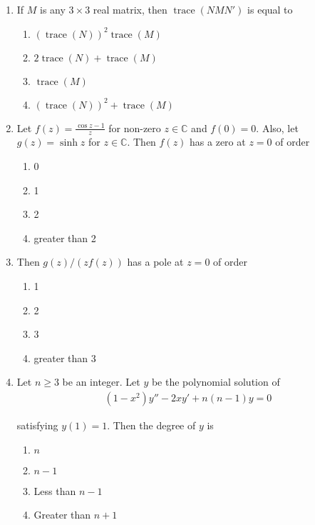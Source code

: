 \documentclass[journal]{IEEEtran}
\numberwithin{equation}{enumi}
\numberwithin{figure}{enumi}
\begin{document}
\begin{enumerate}
\item
If $M$ is any $3 \times 3$ real matrix, then $\operatorname{trace}(N M N')$ is equal to
\hfill{}
\begin{multicols}{2}
\begin{enumerate}
    \item $(\operatorname{trace}(N))^2 \operatorname{trace}(M)$
    \item $2 \operatorname{trace}(N) + \operatorname{trace}(M)$
    \item $\operatorname{trace}(M)$
    \item $(\operatorname{trace}(N))^2 + \operatorname{trace}(M)$
\end{enumerate}
\end{multicols}

\item
Let $f(z) = \frac{\cos z - 1}{z}$ for non-zero $z \in \mathbb{C}$ and $f(0) = 0$. Also, let $g(z) = \sinh z$ for $z \in \mathbb{C}$. Then $f(z)$ has a zero at $z=0$ of order
\hfill{}
\begin{multicols}{4}
\begin{enumerate}
    \item 0
    \item 1
    \item 2
    \item greater than 2
\end{enumerate}
\end{multicols}

\item
Then $g(z)/ (z f(z))$ has a pole at $z=0$ of order
\hfill{}
\begin{multicols}{4}
\begin{enumerate}
    \item 1
    \item 2
    \item 3
    \item greater than 3
\end{enumerate}
\end{multicols}

\item
Let $n \geq 3$ be an integer. Let $y$ be the polynomial solution of
\begin{align}
    (1 - x^2) y'' - 2 x y' + n(n-1) y = 0
\end{align}

satisfying $y(1) = 1$. Then the degree of $y$ is
\hfill{}
\begin{multicols}{2}
\begin{enumerate}
    \item $n$
    \item $n-1$
    \item Less than $n-1$
    \item Greater than $n+1$
\end{enumerate}
\end{multicols}


\end{enumerate}
\end{document}
